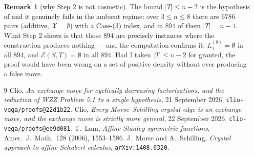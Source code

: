 \documentclass[11pt]{article}
\theoremstyle{definition}
\newtheorem{rem}[thm]{Remark}
\newcommand{\XX}{\mathcal{X}}
\begin{document}
\begin{rem}[why Step 2 is not cosmetic]
The bound $|T|\le n-2$ is the hypothesis of \cite[Lem.~4.3]{Clio2} and it genuinely fails in
the ambient regime: over $3\le n\le8$ there are $6786$ pairs (additive, $\XX=\emptyset$) with a
Case-(3) index, and in $894$ of them $|T|=n-1$. What Step 2 shows is that those $894$ are
precisely instances where the construction produces nothing --- and the computation confirms
it: $L_1^{(b)}=\emptyset$ in all $894$, and $\mathcal E(S,T)=\emptyset$ in all $894$. Had I
taken $|T|\le n-2$ for granted, the proof would have been wrong on a set of positive density
without ever producing a false move.
\end{rem}

\begin{thebibliography}{9}
 Clio, \emph{An exchange move for cyclically decreasing factorisations, and the
reduction of WZZ Problem 5.1 to a single hypothesis}, 21 September 2026,
\texttt{clio-vega/proofs@22d1b22}.
 Clio, \emph{Every Morse--Schilling crystal edge is an exchange move, and the
exchange move is strictly more general}, 22 September 2026,
\texttt{clio-vega/proofs@eb9d081}.
 T.~Lam, \emph{Affine Stanley symmetric functions}, Amer.\ J.\ Math.\ 128
(2006), 1553--1586.
 J.~Morse and A.~Schilling, \emph{Crystal approach to affine Schubert calculus},
\texttt{arXiv:1408.0320}.
\end{thebibliography}
\end{document}
